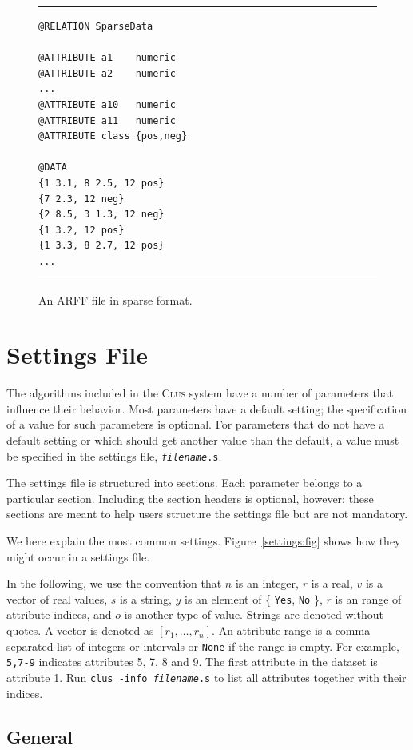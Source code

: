 \documentclass[a4paper]{report}
\newcommand{\clus}{\textsc{Clus}}
\begin{document}
\begin{figure}[tb]
\hrule
\begin{verbatim}
@RELATION SparseData

@ATTRIBUTE a1    numeric
@ATTRIBUTE a2    numeric
...
@ATTRIBUTE a10   numeric
@ATTRIBUTE a11   numeric
@ATTRIBUTE class {pos,neg}

@DATA
{1 3.1, 8 2.5, 12 pos}
{7 2.3, 12 neg}
{2 8.5, 3 1.3, 12 neg}
{1 3.2, 12 pos}
{1 3.3, 8 2.7, 12 pos}
...
\end{verbatim}
\hrule
\caption{An ARFF file in sparse format.}
\label{arffsparse:fig}
\end{figure}

\chapter{Settings File}
\label{ch:sett}

The algorithms included in the \clus{} system have a number of parameters that influence their behavior.  Most parameters have a default setting; the specification of a value for such parameters is optional.  For parameters that do not have a default setting or which should get another value than the default, a value must be specified in the settings file, {\tt {\em filename}.s}.

The settings file is structured into sections.  Each parameter belongs to a particular section.  Including the section headers is optional, however; these sections are meant to help users structure the settings file but are not mandatory.

We here explain the most common settings.  Figure~\ref{settings:fig} shows how they might occur in a settings file.

In the following, we use the convention that $n$ is an integer, $r$ is a real, $v$ is a vector of real values, $s$ is a string, $y$ is an element of \{ {\tt Yes}, {\tt No} \}, $r$ is an range of attribute indices, and $o$ is another type of value.  Strings are denoted without quotes. A vector is denoted as $[r_1,\ldots,r_n]$. An attribute range is a comma separated list of integers or intervals or \texttt{None} if the range is empty. For example, {\tt 5,7-9} indicates attributes 5, 7, 8 and 9. The first attribute in the dataset is attribute 1. Run {\tt clus -info {\em filename}.s} to list all attributes together with their indices.

\section{General}
\end{document}

